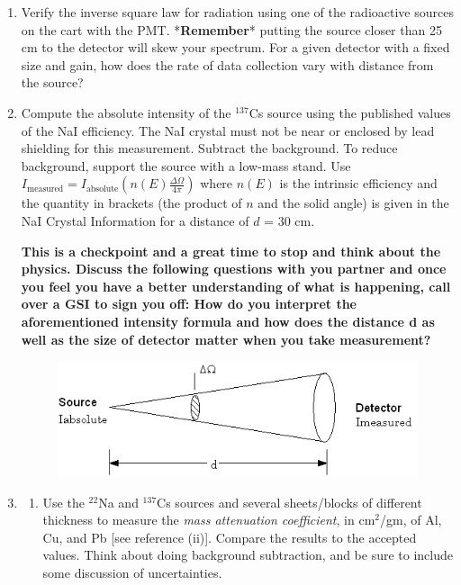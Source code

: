 \documentclass{../lab}
\begin{document}
\begin{enumerate}
\begin{enumerate}
    \end{enumerate}

    \item Verify the inverse square law for radiation using one of the radioactive sources on the cart with the PMT. *\textbf{Remember}* putting the source closer than 25 cm to the detector will skew your spectrum. For a given detector with a fixed size and gain, how does the rate of data collection vary with distance from the source?

    \item Compute the absolute intensity of the $^{137}$Cs source using the published values of the NaI efficiency. The NaI crystal must not be near or enclosed by lead shielding for this measurement. Subtract the background. To reduce background, support the source with a low-mass stand. Use $I_\textrm{measured} = I_\textrm{absolute} (n(E)\frac{\Delta\Omega}{4\pi})$ where $n(E)$ is the intrinsic efficiency and the quantity in brackets (the product of $n$ and the solid angle) is given in the NaI Crystal Information for a distance of $d$ = 30 cm.
    
    \textbf{This is a checkpoint and a great time to stop and think about the physics. Discuss the following questions with you partner and once you feel you have a better understanding of what is happening, call over a GSI to sign you off: How do you interpret the aforementioned intensity formula and how does the distance d as well as the size of detector matter when you take measurement?}

    \begin{figure}[h]
        \centering
        \href{http://experimentationlab.berkeley.edu/sites/default/files/images/GMAimage007.gif}{\includegraphics[width=0.8\linewidth]{images/GMAimage007.png}}
        \label{fig:GMAimage007}
    \end{figure}

    \item \begin{enumerate}
        \item Use the $^{22}$Na and $^{137}$Cs sources and several sheets/blocks of different thickness to measure the \emph{mass attenuation coefficient}, in cm$^2$/gm, of Al, Cu, and Pb [see reference (ii)]. Compare the results to the accepted values. Think about doing background subtraction, and be sure to include some discussion of uncertainties.


\end{enumerate}
\end{enumerate}
\end{document}
